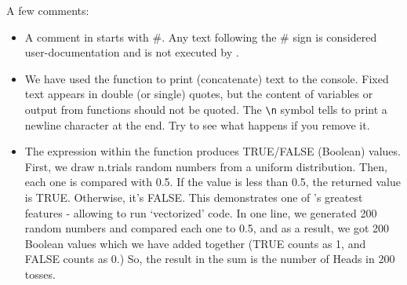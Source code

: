 A few comments:
\begin{itemize}
\item A comment in \R starts with \#. Any text following the \# sign is considered user-documentation and is not executed by \R.
\item We have used the  function to print (concatenate) text to the console. Fixed text appears in double (or single) quotes, but the content of variables or output from \R functions should not be quoted. The \verb|\n| symbol tells \R to print a newline character at the end. Try to see what happens if you remove it.
\item The expression within the  function produces TRUE/FALSE (Boolean) values. First, we draw n.trials random numbers from a uniform distribution. Then, each one is compared with 0.5. If the value is less than 0.5, the returned value is TRUE. Otherwise, it's FALSE. This demonstrates one of \R's greatest features - allowing to run `vectorized' code. In one line, we generated 200 random numbers and compared each one to 0.5, and as a result, we got 200 Boolean values which we have added together (TRUE counts as 1, and FALSE counts as 0.) So, the result in the sum is the number of Heads in 200 tosses.
\end{itemize}

